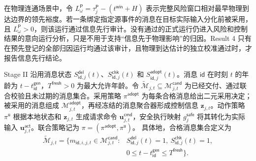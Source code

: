 \documentclass[10pt,a4paper,twocolumn]{article}
\begin{document}
在物理连通场景中，令 $L_{\omega}^{\mathsf P}=\tau_j^{\mathsf P}-(t^{\mathsf{win}}+H)$ 表示完整风险窗口相对最早物理到达边界的领先裕度。若一条绑定指定源事件的消息在目标实际输入分化前被采用，且 $L_{\omega}^{\mathsf P}>0$，则该运行通过信息先行审计。没有通过的正式运行仍进入风险和控制结果的意向运行分析，只是不用于支持“信息先于物理影响”的归因。Result 4 只有在预先登记的全部归因运行均通过该审计，且物理到达估计的独立校准通过时，才报告信息先行结论。

Stage II 沿用消息状态 $S_{\mathsf{id},j}^{\mathsf{del}}(t)$、$S_{\mathsf{id},j}^{\mathsf{chk}}(t)$ 和 $S_{\mathsf{id},j}^{\mathsf{adopt}}(t)$。消息 $\mathsf{id}$ 在时刻 $t$ 的年龄为 $t-t_{\mathsf{id}}^{\mathsf{gen}}$，$T^{\mathsf{fresh}}>0$ 为最大允许年龄。令 $\widetilde{\mathcal M}_{j,t}\subseteq\mathcal M_{j,t}^{\mathsf{cand}}$ 为已经交付、通过联合校验且未过期的消息集合。采用策略 $\pi^{\mathsf{adopt}}$ 为每条合格消息给出二元采用决定；被采用的消息组成 $\mathcal M_{j,t}^{\mathsf{adopt}}$，再经冻结的消息聚合器形成控制信息 $\mathbf z_{j,t}$。动作策略 $\pi^{\mathsf u}$ 根据本地状态和 $\mathbf z_{j,t}$ 生成请求命令 $\mathbf u_{j,t}^{\mathsf{cmd}}$，安全执行映射 $g_j^{\mathsf{safe}}$ 将其转化为实际输入 $\mathbf u_{j,t}^{\mathsf{act}}$。联合策略记为 $\pi=(\pi^{\mathsf{adopt}},\pi^{\mathsf u})$。
具体地，合格消息集合定义为
\begin{equation*}
\begin{aligned}
\widetilde{\mathcal M}_{j,t}=\{m_{\mathsf{id},i,j,t}\in \mathcal M_{j,t}^{\mathsf{cand}}:
&S_{\mathsf{id},j}^{\mathsf{del}}(t)=1,\ S_{\mathsf{id},j}^{\mathsf{chk}}(t)=1,\\
&0\leq t-t_{\mathsf{id}}^{\mathsf{gen}}\leq T^{\mathsf{fresh}}\}.
\end{aligned}
\end{equation*}
\end{document}
